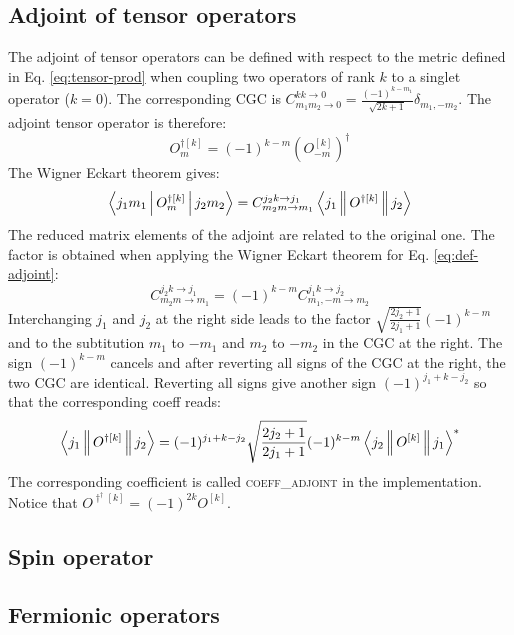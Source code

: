 \documentclass[a4paper,10pt,parskip=full]{scrartcl}
\begin{document}
\subsection{Adjoint of tensor operators}
The adjoint of tensor operators can be defined with respect to the metric defined in
Eq. \eqref{eq:tensor-prod} when coupling two operators of rank $k$ to
a singlet operator ($k=0$). The corresponding CGC is
$C^{kk\rightarrow 0}_{m_1m_2\rightarrow 0}=\frac{(-1)^{k-m_1}}{\sqrt{2k+1}}\delta_{m_1,-m_2}$.
The adjoint tensor operator is therefore:
\begin{equation}
  \label{eq:def-adjoint}
  O^{\dagger [k]}_m = (-1)^{k-m}\left(O^{[k]}_{-m}\right)^\dagger
\end{equation}
The Wigner Eckart theorem gives:
\begin{equation}
  \Braket{j_1m_1|O^{\dagger [k]}_m|j_2m_2}=C^{j_2k\rightarrow j_1}_{m_2m\rightarrow m_1}\Braket{j_1||O^{\dagger[k]}||j_2}
\end{equation}
The reduced matrix elements of the adjoint are related to the original one.
The factor is obtained when applying the Wigner Eckart theorem for Eq. \eqref{eq:def-adjoint}:
\begin{equation}
  C^{j_2k\rightarrow j_1}_{m_2m\rightarrow m_1} = (-1)^{k-m} C^{j_1k\rightarrow j_2}_{m_1,-m\rightarrow m_2}
\end{equation}
Interchanging $j_1$ and $j_2$ at the right side leads to the factor $\sqrt{\frac{2j_2+1}{2j_1+1}}(-1)^{k-m}$
and to the subtitution $m_1$ to $-m_1$ and $m_2$ to $-m_2$ in the CGC at the right.
The sign $(-1)^{k-m}$ cancels and after reverting all signs of the CGC at the right, the two
CGC are identical. Reverting all signs give another sign $(-1)^{j_1+k-j_2}$ so that the corresponding coeff reads:
\begin{equation}
  \Braket{j_1||O^{\dagger[k]}||j_2} = (-1)^{j_1+k-j_2}\sqrt{\frac{2j_2+1}{2j_1+1}}(-1)^{k-m}\Braket{j_2||O^{[k]}||j_1}^*
\end{equation}
The corresponding coefficient is called \textsc{coeff\_adjoint} in the implementation.
Notice that $O^{\dagger^\dagger[k]}=(-1)^{2k}O^{[k]}$.
\subsection{Spin operator}

\subsection{Fermionic operators}
\end{document}

